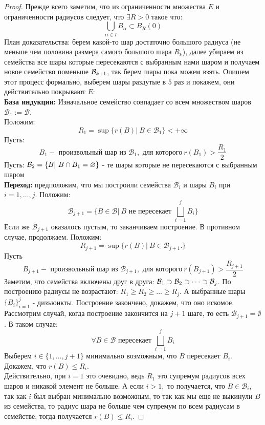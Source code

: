 \begin{proof}
     Прежде всего заметим, что из ограниченности множества $E$ и ограниченности радиусов следует, что $\exists R > 0$ такое что:
    $$\bigcup_{\alpha \in I}B_{\alpha} \subset B_{R}(0)$$
    План доказательства: берем какой-то шар достаточно большого радиуса (не меньше чем половина размера самого большого шара $R_k$), далее убираем из семейства все шары которые пересекаются с выбранным нами шаром и получаем новое семейство поменьше $\mathcal{B}_{k+1}$, так берем шары пока можем взять. Опишем этот процесс формально, выберем шары раздутые в $5$ раз и покажем, они действительно покрывают $E$:\\
    \textbf{База индукции:} Изначальное семейство совпадает со всем множеством шаров $\mathcal{B}_1 := \mathcal{B}$.\\
    Положим:
        $$R_1 = \sup\Big\{r(B) | \ B \in \mathcal{B}_1\Big\} < +\infty$$
    Пусть:
        $$B_1 - \text{ произвольный шар из } \mathcal{B}_1, \text{ для которого} \ r(B_1) > \frac{R_1}{2}$$
        Пусть:
        $\mathcal{B}_2 = \{B| \ B\cap B_1 = \varnothing \}$ - те шары которые не пересекаются с выбранным шаром \\
    \textbf{Переход:} предположим, что мы построили семейства $\mathcal{B}_i$ и шары $B_i$ при $i = 1, \dots, j$. Положим:
        $$\mathcal{B}_{j + 1} = \{B \in \mathcal{B}|\  B \text{ не пересекает } \bigsqcup_{i = 1}^{j} B_i\}$$
        Если же $\mathcal{B}_{j + 1}$ оказалось пустым, то заканчиваем построение. В противном случае, продолжаем. Положим:
        $$R_{j + 1} = \sup\{r(B) | \ B \in \mathcal{B}_{j + 1}.\}$$
        Пусть
        $$B_{j + 1} - \text{ произвольный шар из } \mathcal{B}_{j + 1}, \text{ для которого} \  r(B_{j + 1}) > \frac{R_{j + 1}}{2}$$
        Заметим, что семейства включены друг в друга: $\mathcal{B}_1 \supset \mathcal{B}_2 \supset \dots \supset \mathcal{B}_{j}$. По построению радиусы не возрастают: $R_1 \geq R_2 \geq ... \geq R_{j}$. А выбранные шары $\{B_i\}_{i=1}^j$ - дизъюнкты.
    Построение закончено, докажем, что оно искомое.\\ 
    Рассмотрим случай, когда построение закончится на $j + 1$ шаге, то есть $\mathcal{B}_{j + 1} = \emptyset$. В таком случае:
    $$\forall B \in \mathcal{B} \text{ пересекает } \bigsqcup_{i = 1}^{j} B_i$$
    Выберем $i \in \{1, \dots, j + 1\}$ минимально возможным, что $B$ пересекает $B_i.$ Докажем, что $r(B) \leq R_i$. \\
    Действительно, при $i = 1$ это очевидно, ведь $R_1$ это супремум радиусов всех шаров и никакой элемент не больше. А если $i > 1,$ то получается, что $B \in \mathcal{B}_{i}$, так как $i$ был выбран минимально возможным, то так как мы еще не выкинули $B$ из семейства, то радиус шара не больше чем супремум по всем радиусам в семействе, тогда получается $r(B) \leq R_i.$


\end{proof}
